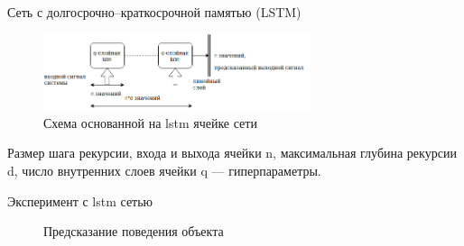 \documentclass{beamer}
\begin{document}
\begin{frame}{Сеть с долгосрочно--краткосрочной памятью (LSTM)}
\begin{figure}[h]
    \centering
    \includegraphics[width=0.7\textwidth]{rnn}
    \caption{Схема основанной на lstm ячейке сети}
\end{figure}
Размер шага рекурсии, входа и выхода ячейки n, максимальная глубина рекурсии d, число внутренних слоев ячейки q --- гиперпараметры. 
\end{frame}

\begin{frame}{Эксперимент с lstm сетью}
\begin{figure}[!ht]
     \hfill
     \caption{Предсказание поведения объекта}
     \label{fig:dummy}
\end{figure}
\end{frame}
\end{document}
